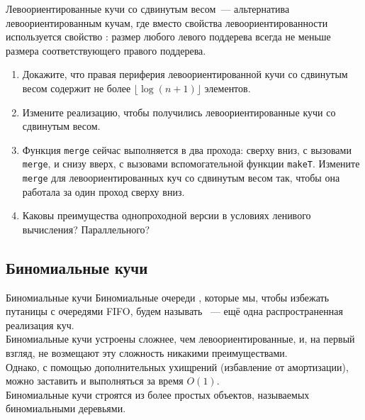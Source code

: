 \begin{frame}[fragile]{}
\begin{exercise}\label{ex:3.4}
 Левоориентированные кучи
 со сдвинутым весом~--- альтернатива левоориентированным кучам, где
 вместо свойства левоориентированности используется свойство
 : размер любого левого поддерева всегда не меньше размера
 соответствующего правого поддерева.
 \begin{enumerate}
   \item Докажите, что правая периферия левоориентированной кучи со
   сдвинутым весом содержит не более $\lfloor \log(n+1) \rfloor$ элементов.
   \item Измените реализацию, чтобы получились
   левоориентированные кучи со сдвинутым весом.
   \item Функция \lstinline!merge! сейчас выполняется в два прохода:
   сверху вниз, с вызовами \lstinline!merge!, и снизу вверх, с
   вызовами вспомогательной функции \lstinline!makeT!. Измените
   \lstinline!merge! для левоориентированных куч со сдвинутым весом
   так, чтобы она работала за один проход сверху вниз.
   \item Каковы преимущества однопроходной версии в
   условиях ленивого вычисления? Параллельного?
 \end{enumerate}
\end{exercise}
\end{frame}
\fi 


\subsection{Биномиальные кучи}

\begin{frame}{Биномиальные кучи}
Биномиальные очереди \cite{Vuillemin1978, Brown1978}, которые мы,
чтобы избежать путаницы с очередями FIFO, будем называть ~--- ещё одна распространенная реализация
куч. \\

Биномиальные кучи устроены сложнее, чем левоориентированные, и, на
первый взгляд, не возмещают эту сложность никакими
преимуществами. \\

Однако, с помощью дополнительных ухищрений (избавление от амортизации), можно заставить  и
 выполняться за время $O(1)$.\\

Биномиальные кучи строятся из более простых объектов, называемых
 биномиальными деревьями. 
\end{frame}


